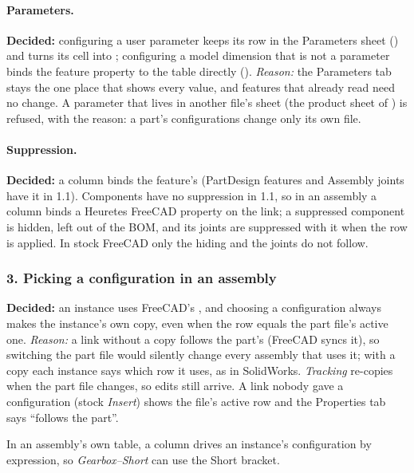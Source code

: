 \paragraph{Parameters.} \textbf{Decided:} configuring a user parameter keeps its row in the Parameters sheet
() and turns its cell into ; configuring a model dimension that is
not a parameter binds the feature property to the table directly ().
\emph{Reason:} the Parameters tab stays the one place that shows every value, and features that already read
 need no change. A parameter that lives in another file's sheet (the product sheet of
) is refused, with the reason: a part's configurations change only its own file.

\paragraph{Suppression.} \textbf{Decided:} a  column binds the feature's 
(PartDesign features and Assembly joints have it in 1.1). Components have no suppression in 1.1, so in an
assembly a  column binds a Heuretes FreeCAD  property on the link; a suppressed
component is hidden, left out of the BOM, and its joints are suppressed with it when the row is applied.
In stock FreeCAD only the hiding and the joints do not follow.

\subsubsection*{3. Picking a configuration in an assembly}

\textbf{Decided:} an instance uses FreeCAD's , and choosing a configuration
always makes the instance's own copy, even when the row equals the part file's active one. \emph{Reason:} a
link without a copy follows the part's  (FreeCAD syncs it), so switching the part file
would silently change every assembly that uses it; with a copy each instance says which row it uses, as in
SolidWorks. \emph{Tracking} re-copies when the part file changes, so edits still arrive. A link nobody gave a
configuration (stock \emph{Insert}) shows the file's active row and the Properties tab says ``follows the
part''.

In an assembly's own table, a  column drives an instance's configuration by expression, so
\emph{Gearbox--Short} can use the Short bracket.

